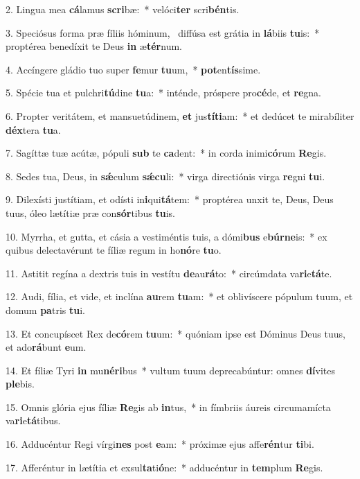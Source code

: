 2. Lingua mea \textbf{cá}lamus \textbf{scri}bæ:~*  velóci\textbf{ter} scri\textbf{bén}tis.\

3. Speciósus forma præ fíliis hóminum, \dag\  diffúsa est grátia in \textbf{lá}biis \textbf{tu}is:~*  proptérea benedíxit te Deus \textbf{in} æ\textbf{tér}num.\

4. Accíngere gládio tuo super \textbf{fe}mur \textbf{tu}um,~*  \textbf{pot}en\textbf{tís}sime.\

5. Spécie tua et pulchri\textbf{tú}dine \textbf{tu}a:~*  inténde, próspere pro\textbf{cé}de, et \textbf{re}gna.\

6. Propter veritátem, et mansuetúdinem, \textbf{et} jus\textbf{tí}\textbf{ti}am:~*  et dedúcet te mirabíliter \textbf{déx}tera \textbf{tu}a.\

7. Sagíttæ tuæ acútæ, pópuli \textbf{sub} te \textbf{ca}dent:~*  in corda inimi\textbf{có}rum \textbf{Re}gis.\

8. Sedes tua, Deus, in \textbf{sǽ}culum \textbf{sǽ}\textbf{cu}li:~*  virga directiónis virga \textbf{re}gni \textbf{tu}i.\

9. Dilexísti justítiam, et odísti in\textbf{i}qui\textbf{tá}tem:~*  proptérea unxit te, Deus, Deus tuus, óleo lætítiæ præ con\textbf{sór}tibus \textbf{tu}is.\

10. Myrrha, et gutta, et cásia a vestiméntis tuis, a dómi\textbf{bus} e\textbf{búr}\textbf{ne}is:~*  ex quibus delectavérunt te fíliæ regum in ho\textbf{nó}re \textbf{tu}o.\

11. Astitit regína a dextris tuis in vestítu \textbf{de}au\textbf{rá}to:~*  circúmdata va\textbf{ri}e\textbf{tá}te.\

12. Audi, fília, et vide, et inclína \textbf{au}rem \textbf{tu}am:~*  et oblivíscere pópulum tuum, et domum \textbf{pa}tris \textbf{tu}i.\

13. Et concupíscet Rex de\textbf{có}rem \textbf{tu}um:~*  quóniam ipse est Dóminus Deus tuus, et ado\textbf{rá}bunt \textbf{e}um.\

14. Et fíliæ Tyri \textbf{in} mu\textbf{né}\textbf{ri}bus~*  vultum tuum deprecabúntur: omnes \textbf{dí}vites \textbf{ple}bis.\

15. Omnis glória ejus fíliæ \textbf{Re}gis ab \textbf{in}tus,~*  in fímbriis áureis circumamícta va\textbf{ri}e\textbf{tá}tibus.\

16. Adducéntur Regi vírgi\textbf{nes} post \textbf{e}am:~*  próximæ ejus affe\textbf{rén}tur \textbf{ti}bi.\

17. Afferéntur in lætítia et exsul\textbf{ta}ti\textbf{ó}ne:~*  adducéntur in \textbf{tem}plum \textbf{Re}gis.\

